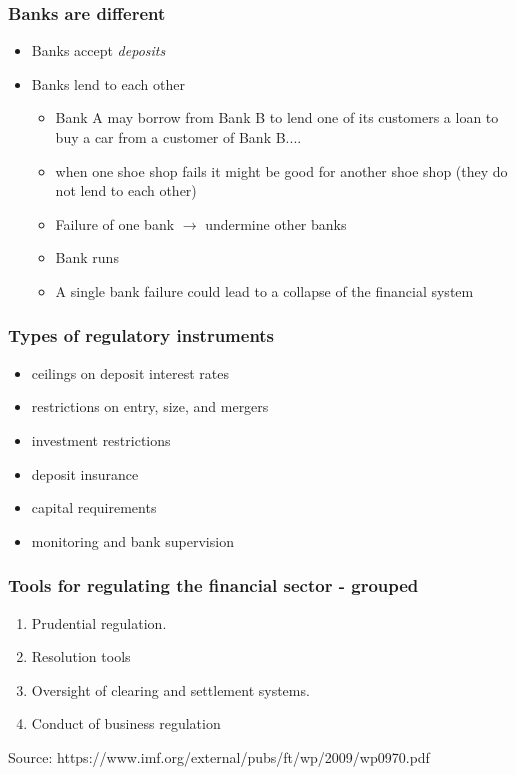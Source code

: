 \documentclass[11pt]{beamer}
\begin{document}
\begin{frame}
\frametitle{Banks are different}
\begin{itemize}
\item Banks accept \textit{deposits}
\item Banks lend to each other
\begin{itemize}
\item Bank A may borrow from Bank B to lend one of its customers a loan to
buy a car from a customer of Bank B.... \\
\item when one shoe shop fails it might be good for another shoe shop (they do not lend to each other)
\item Failure of one bank $\rightarrow$ undermine other banks
\item Bank runs
\item A single bank failure could lead to a collapse of the financial system
\end{itemize}
\end{itemize}
\end{frame}




\begin{frame}
\frametitle{Types of regulatory instruments}
\begin{itemize}
\item ceilings on deposit interest rates
\item restrictions on entry, size, and mergers
\item investment restrictions
\item deposit insurance
\item capital requirements
\item monitoring and bank supervision
\end{itemize}
\end{frame}

\begin{frame}
\frametitle{Tools for regulating the financial sector - grouped}
\begin{enumerate}
\item Prudential regulation.
\item Resolution tools
\item Oversight of clearing and settlement systems.
\item Conduct of business regulation
\end{enumerate}
\tiny{Source: https://www.imf.org/external/pubs/ft/wp/2009/wp0970.pdf}
\end{frame}
\end{document}
